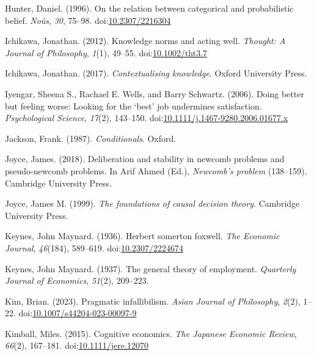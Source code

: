 \documentclass[
  10pt,
  letterpaper,
  twoside]{scrbook}
\newlength{\cslhangindent}
\newenvironment{CSLReferences}[2] %
 {\begin{list}{}{%
  \setlength{\itemindent}{0pt}
  \setlength{\leftmargin}{0pt}
  \setlength{\parsep}{0pt}
  \ifodd #1
   \setlength{\leftmargin}{\cslhangindent}
   \setlength{\itemindent}{-1\cslhangindent}
  \fi
  \setlength{\itemsep}{#2\baselineskip}}}
 {\end{list}}
\begin{document}
\begin{CSLReferences}{1}{0}
Hunter, Daniel. (1996). On the relation between categorical and
probabilistic belief. \emph{No{û}s}, \emph{30}, 75--98.
doi:\href{https://doi.org/10.2307/2216304}{10.2307/2216304}

Ichikawa, Jonathan. (2012). Knowledge norms and acting well.
\emph{Thought: A Journal of Philosophy}, \emph{1}(1), 49--55.
doi:\href{https://doi.org/10.1002/tht3.7}{10.1002/tht3.7}

Ichikawa, Jonathan. (2017). \emph{Contextualising knowledge}. {O}xford
{U}niversity {P}ress.

Iyengar, Sheena S., Rachael E. Wells, and Barry Schwartz. (2006). Doing
better but feeling worse: Looking for the {`best'} job undermines
satisfaction. \emph{Psychological Science}, \emph{17}(2), 143--150.
doi:\href{https://doi.org/10.1111/j.1467-9280.2006.01677.x}{10.1111/j.1467-9280.2006.01677.x}

Jackson, Frank. (1987). \emph{Conditionals}. Oxford.

Joyce, James. (2018). Deliberation and stability in newcomb problems and
pseudo-newcomb problems. In Arif Ahmed (Ed.), \emph{Newcomb's problem}
(138--159). Cambridge University Press.

Joyce, James M. (1999). \emph{The foundations of causal decision
theory}. Cambridge University Press.

Keynes, John Maynard. (1936). Herbert somerton foxwell. \emph{The
Economic Journal}, \emph{46}(184), 589--619.
doi:\href{https://doi.org/10.2307/2224674}{10.2307/2224674}

Keynes, John Maynard. (1937). The general theory of employment.
\emph{Quarterly Journal of Economics}, \emph{51}(2), 209--223.

Kim, Brian. (2023). Pragmatic infallibilism. \emph{Asian Journal of
Philosophy}, \emph{2}(2), 1--22.
doi:\href{https://doi.org/10.1007/s44204-023-00097-9}{10.1007/s44204-023-00097-9}

Kimball, Miles. (2015). Cognitive economics. \emph{The Japanese Economic
Review}, \emph{66}(2), 167--181.
doi:\href{https://doi.org/10.1111/jere.12070}{10.1111/jere.12070}


\end{CSLReferences}
\end{document}
